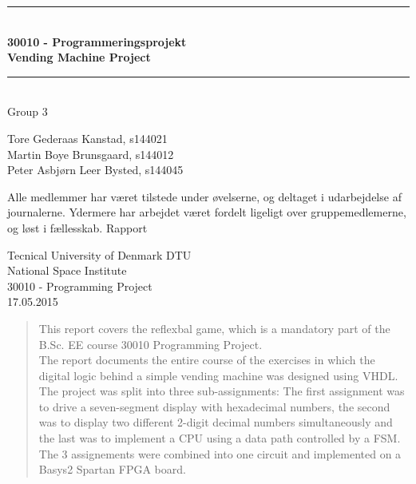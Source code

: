 \begin{titlepage}

\centering \parindent=0pt
\newcommand{\HRule}{\rule{\textwidth}{1mm}}
 \HRule\\[0.7cm]\Huge\bfseries
30010 - Programmeringsprojekt \\[0.7cm] %
Vending Machine Project\\ %
\HRule\\[2cm]  
\Large
Group 3
\\
\large

Tore Gederaas Kanstad, s144021 \\

Martin Boye Brunsgaard, s144012	\\

Peter Asbjørn Leer Bysted, s144045 \\

 \normalsize

Alle medlemmer har været tilstede under øvelserne, og deltaget i udarbejdelse af journalerne. Ydermere har arbejdet været fordelt ligeligt over gruppemedlemerne, og løst i fællesskab. Rapport
\begin{flushleft}
Tecnical University of Denmark DTU\\ %
National Space Institute\\ 
30010 - Programming Project\\ %
17.05.2015 %
\end{flushleft}
\end{titlepage}
\newpage
\renewcommand{\abstractname}{Abstract}
\begin{abstract}

This report covers the reflexbal game, which is a mandatory part of the B.Sc. EE course 30010 Programming Project.\\ The report documents the entire course of the exercises in which the digital logic behind a simple vending machine was designed using VHDL. The project was split into three sub-assignments: The first assignment was to drive a seven-segment display with hexadecimal numbers, the second was to display two different 2-digit decimal numbers simultaneously  and the last was to implement a CPU using a data path controlled by a FSM. The 3 assignements were combined into one circuit and implemented on a Basys2 Spartan FPGA board.
\end{abstract}
\newpage
\tableofcontents


\newpage
